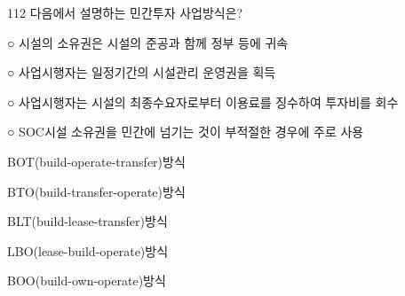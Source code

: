 \begin{question}{112}
다음에서 설명하는 민간투자 사업방식은?
\begin{framedtext}
○ 시설의 소유권은 시설의 준공과 함께 정부 등에 귀속 \par
○ 사업시행자는 일정기간의 시설관리 운영권을 획득 \par
○ 사업시행자는 시설의 최종수요자로부터 이용료를 징수하여 투자비를 회수 \par
○ SOC시설 소유권을 민간에 넘기는 것이 부적절한 경우에 주로 사용 \par
\end{framedtext}
\begin{choices}
  \item BOT(build-operate-transfer)방식
  \item BTO(build-transfer-operate)방식
  \item BLT(build-lease-transfer)방식
  \item LBO(lease-build-operate)방식
  \item BOO(build-own-operate)방식
\end{choices}
\end{question}
